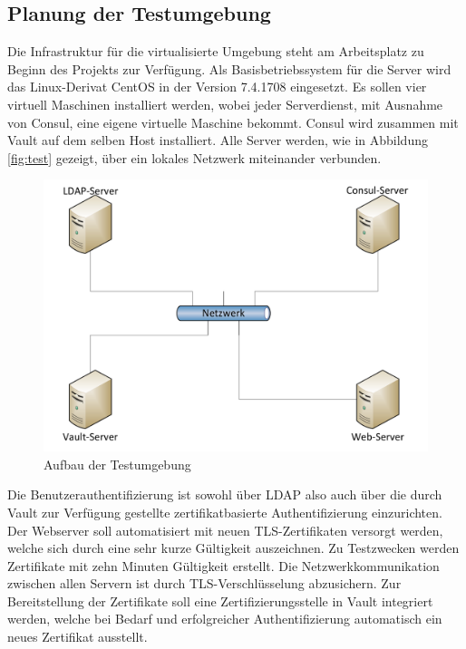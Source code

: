 \documentclass[
book,
a4paper,   
titlepage,  
halfparskip,
12pt        
]{scrartcl}
\begin{document}
\begin{onehalfspacing}
\subsection{Planung der Testumgebung}
\label{subsec:plan}
Die Infrastruktur für die virtualisierte Umgebung steht am Arbeitsplatz zu Beginn des Projekts zur Verfügung. Als Basisbetriebssystem für die Server wird das Linux-Derivat CentOS in der Version 7.4.1708 eingesetzt. Es sollen vier virtuell Maschinen installiert werden, wobei jeder Serverdienst, mit Ausnahme von Consul, eine eigene virtuelle Maschine bekommt. Consul wird zusammen mit Vault auf dem selben Host installiert. Alle Server werden, wie in Abbildung \vref{fig:test} gezeigt, über ein lokales Netzwerk miteinander verbunden.\newline

\begin{figure}[h]
	\centering
	\includegraphics[width=1\linewidth]{plan}
	\caption[Netzplan]{Aufbau der Testumgebung}
	\label{fig:test}
\end{figure}

Die Benutzerauthentifizierung ist sowohl über \ac{LDAP} also auch über die durch Vault zur Verfügung gestellte zertifikatbasierte Authentifizierung einzurichten. Der Webserver soll automatisiert mit neuen \ac{TLS}-Zertifikaten versorgt werden, welche sich durch eine sehr kurze Gültigkeit auszeichnen. Zu Testzwecken werden Zertifikate mit zehn Minuten Gültigkeit erstellt. Die Netzwerkkommunikation zwischen allen Servern ist durch \ac{TLS}-Verschlüsselung abzusichern. Zur Bereitstellung der Zertifikate soll eine Zertifizierungsstelle in Vault integriert werden, welche bei Bedarf und erfolgreicher Authentifizierung automatisch ein neues Zertifikat ausstellt. 

\end{onehalfspacing}
\end{document}
